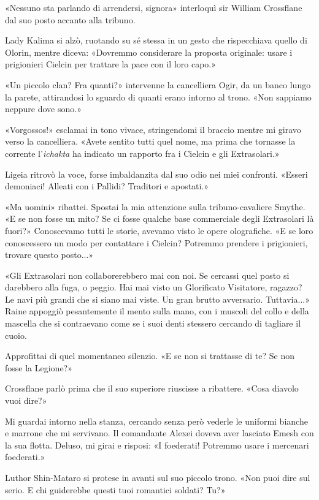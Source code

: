 «Nessuno sta parlando di arrendersi, signora» interloquì sir William
Crossflane dal suo posto accanto alla tribuno.

Lady Kalima si alzò, ruotando su sé stessa in un gesto che rispecchiava
quello di Olorin, mentre diceva: «Dovremmo considerare la proposta
originale: usare i prigionieri Cielcin per trattare la pace con il loro
capo.»

«Un piccolo clan? Fra quanti?» intervenne la cancelliera Ogir, da un
banco lungo la parete, attirandosi lo sguardo di quanti erano intorno al
trono. «Non sappiamo neppure dove sono.»

«Vorgossos!» esclamai in tono vivace, stringendomi il braccio mentre mi
giravo verso la cancelliera. «Avete sentito tutti quel nome, ma prima
che tornasse la corrente l'\emph{ichakta} ha indicato un rapporto fra i
Cielcin e gli Extrasolari.»

Ligeia ritrovò la voce, forse imbaldanzita dal suo odio nei miei
confronti. «Esseri demoniaci! Alleati con i Pallidi? Traditori e
apostati.»

«Ma uomini» ribattei. Spostai la mia attenzione sulla tribuno-cavaliere
Smythe. «E se non fosse un mito? Se ci fosse qualche base commerciale
degli Extrasolari là fuori?» Conoscevamo tutti le storie, avevamo visto
le opere olografiche. «E se loro conoscessero un modo per contattare i
Cielcin? Potremmo prendere i prigionieri, trovare questo posto...»

«Gli Extrasolari non collaborerebbero mai con noi. Se cercassi quel
posto si darebbero alla fuga, o peggio. Hai mai visto un Glorificato
Visitatore, ragazzo? Le navi più grandi che si siano mai viste. Un gran
brutto avversario. Tuttavia...» Raine appoggiò pesantemente il mento
sulla mano, con i muscoli del collo e della mascella che si contraevano
come se i suoi denti stessero cercando di tagliare il cuoio.

Approfittai di quel momentaneo silenzio. «E se non si trattasse di te?
Se non fosse la Legione?»

Crossflane parlò prima che il suo superiore riuscisse a ribattere. «Cosa
diavolo vuoi dire?»

Mi guardai intorno nella stanza, cercando senza però vederle le uniformi
bianche e marrone che mi servivano. Il comandante Alexei doveva aver
lasciato Emesh con la sua flotta. Deluso, mi girai e risposi: «I
foederati! Potremmo usare i mercenari foederati.»

Luthor Shin-Mataro si protese in avanti sul suo piccolo trono. «Non puoi
dire sul serio. E chi guiderebbe questi tuoi romantici soldati? Tu?»

